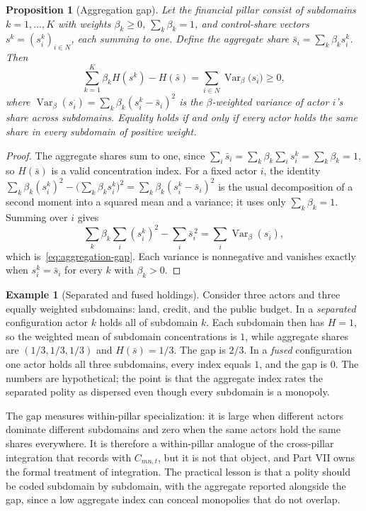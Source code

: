 \documentclass[11pt,letterpaper]{article}
\newtheorem{proposition}[theorem]{Proposition}
\theoremstyle{definition}
\newtheorem{example}[theorem]{Example}
\theoremstyle{remark}
\begin{document}
\begin{proposition}[Aggregation gap]
\label{prop:financial-power:aggregation-gap}
Let the financial pillar consist of subdomains $k=1,\dots,K$ with weights $\beta_k\geq 0$, $\sum_k\beta_k=1$, and control-share vectors $s^{k}=(s^{k}_i)_{i\in N}$, each summing to one. Define the aggregate share $\bar s_i=\sum_k\beta_k s^{k}_i$. Then
\begin{equation}
\label{eq:aggregation-gap}
\sum_{k=1}^{K}\beta_k H(s^{k})-H(\bar s)=\sum_{i\in N}\operatorname{Var}_\beta\bigl(s^{\cdot}_i\bigr)\geq 0,
\end{equation}
where $\operatorname{Var}_\beta(s^{\cdot}_i)=\sum_k\beta_k(s^{k}_i-\bar s_i)^2$ is the $\beta$-weighted variance of actor $i$'s share across subdomains. Equality holds if and only if every actor holds the same share in every subdomain of positive weight.
\end{proposition}

\begin{proof}
The aggregate shares sum to one, since $\sum_i\bar s_i=\sum_k\beta_k\sum_i s^k_i=\sum_k\beta_k=1$, so $H(\bar s)$ is a valid concentration index. For a fixed actor $i$, the identity $\sum_k\beta_k(s^k_i)^2-\bigl(\sum_k\beta_k s^k_i\bigr)^2=\sum_k\beta_k(s^k_i-\bar s_i)^2$ is the usual decomposition of a second moment into a squared mean and a variance; it uses only $\sum_k\beta_k=1$. Summing over $i$ gives
\[
\sum_k\beta_k\sum_i(s^k_i)^2-\sum_i\bar s_i^{\,2}=\sum_i\operatorname{Var}_\beta(s^{\cdot}_i),
\]
which is~\eqref{eq:aggregation-gap}. Each variance is nonnegative and vanishes exactly when $s^k_i=\bar s_i$ for every $k$ with $\beta_k>0$.
\end{proof}

\begin{example}[Separated and fused holdings]
\label{ex:aggregation}
Consider three actors and three equally weighted subdomains: land, credit, and the public budget. In a \emph{separated} configuration actor $k$ holds all of subdomain $k$. Each subdomain then has $H=1$, so the weighted mean of subdomain concentrations is $1$, while aggregate shares are $(1/3,1/3,1/3)$ and $H(\bar s)=1/3$. The gap is $2/3$. In a \emph{fused} configuration one actor holds all three subdomains, every index equals $1$, and the gap is $0$. The numbers are hypothetical; the point is that the aggregate index rates the separated polity as dispersed even though every subdomain is a monopoly.
\end{example}

The gap measures within-pillar specialization: it is large when different actors dominate different subdomains and zero when the same actors hold the same shares everywhere. It is therefore a within-pillar analogue of the cross-pillar integration that \citet{largo2026hbs} records with $C_{mn,t}$, but it is not that object, and Part VII owns the formal treatment of integration. The practical lesson is that a polity should be coded subdomain by subdomain, with the aggregate reported alongside the gap, since a low aggregate index can conceal monopolies that do not overlap.
\end{document}
